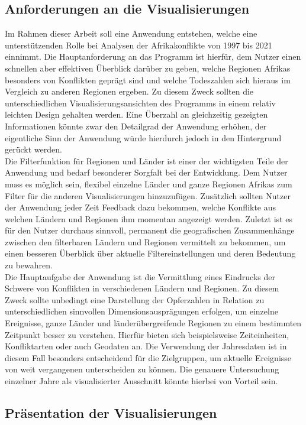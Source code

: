 \documentclass[usegeometry=true]{scrartcl}
\begin{document}
\subsection{Anforderungen an die Visualisierungen}
Im Rahmen dieser Arbeit soll eine Anwendung entstehen, welche eine unterstützenden Rolle bei Analysen der Afrikakonflikte von 1997 bis 2021 einnimmt. Die Hauptanforderung an das Programm ist hierfür, dem Nutzer einen schnellen aber effektiven Überblick darüber zu geben, welche Regionen Afrikas besonders von Konflikten geprägt sind und welche Todeszahlen sich hieraus im Vergleich zu anderen Regionen ergeben. Zu diesem Zweck sollten die unterschiedlichen Visualisierungsansichten des Programms in einem relativ \glqq leichten\grqq{} Design gehalten werden. Eine Überzahl an gleichzeitig gezeigten Informationen könnte zwar den Detailgrad der Anwendung erhöhen, der eigentliche Sinn der Anwendung würde hierdurch jedoch in den Hintergrund gerückt werden.\\ Die Filterfunktion für Regionen und Länder ist einer der wichtigsten Teile der Anwendung und bedarf besonderer Sorgfalt bei der Entwicklung. Dem Nutzer muss es möglich sein, flexibel einzelne Länder und ganze Regionen Afrikas zum Filter für die anderen Visualisierungen hinzuzufügen. Zusätzlich sollten Nutzer der Anwendung jeder Zeit Feedback dazu bekommen, welche Konflikte aus welchen Ländern und Regionen ihm momentan angezeigt werden. Zuletzt ist es für den Nutzer durchaus sinnvoll, permanent die geografischen Zusammenhänge zwischen den filterbaren Ländern und Regionen vermittelt zu bekommen, um einen besseren Überblick über aktuelle Filtereinstellungen und deren Bedeutung zu bewahren.\\ Die Hauptaufgabe der Anwendung ist die Vermittlung eines Eindrucks der Schwere von Konflikten in verschiedenen Ländern und Regionen. Zu diesem Zweck sollte unbedingt eine Darstellung der Opferzahlen in Relation zu unterschiedlichen sinnvollen Dimensionsausprägungen erfolgen, um einzelne Ereignisse, ganze Länder und länderübergreifende Regionen zu einem bestimmten Zeitpunkt besser zu verstehen. Hierfür bieten sich beispielsweise Zeiteinheiten, Konfliktarten oder auch Geodaten an. Die Verwendung der Jahresdaten ist in diesem Fall besonders entscheidend für die Zielgruppen, um aktuelle Ereignisse von weit vergangenen unterscheiden zu können. Die genauere Untersuchung einzelner Jahre als \glqq visualisierter Ausschnitt\grqq{} könnte hierbei von Vorteil sein.\\

\subsection{Präsentation der Visualisierungen}
\end{document}
